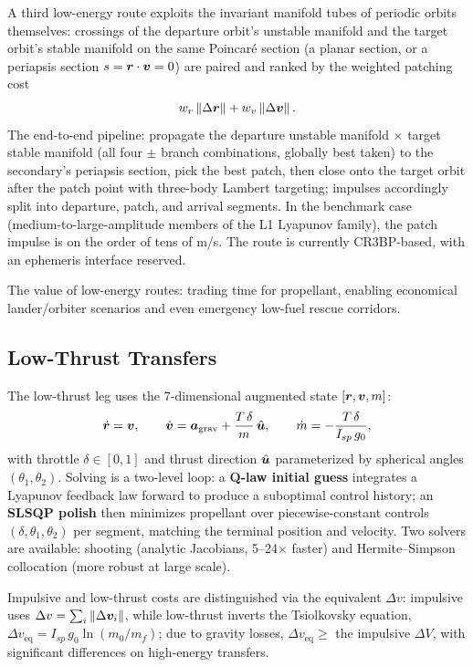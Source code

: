 A third low-energy route exploits the invariant manifold tubes of periodic
orbits themselves: crossings of the departure orbit's unstable manifold and
the target orbit's stable manifold on the same Poincar\'e section (a planar
section, or a periapsis section $s = \bm{r} \cdot \bm{v} = 0$) are paired
and ranked by the weighted patching cost
\begin{equation}
  w_r \left\lVert \Delta \bm{r} \right\rVert + w_v \left\lVert \Delta \bm{v} \right\rVert.
\end{equation}
The end-to-end pipeline: propagate the departure unstable manifold $\times$
target stable manifold (all four $\pm$ branch combinations, globally best
taken) to the secondary's periapsis section, pick the best patch, then close
onto the target orbit after the patch point with three-body Lambert
targeting; impulses accordingly split into departure, patch, and arrival
segments. In the benchmark case (medium-to-large-amplitude members of the L1
Lyapunov family), the patch impulse is on the order of tens of m/s. The route
is currently CR3BP-based, with an ephemeris interface reserved.

The value of low-energy routes: trading time for propellant, enabling
economical lander/orbiter scenarios and even emergency low-fuel rescue
corridors.

\subsection{Low-Thrust Transfers}

The low-thrust leg uses the 7-dimensional augmented state
$[\bm{r}, \bm{v}, m]$:
\begin{equation}
  \dot{\bm{r}} = \bm{v}, \qquad
  \dot{\bm{v}} = \bm{a}_{\mathrm{grav}} + \frac{T\,\delta}{m}\,\hat{\bm{u}}, \qquad
  \dot m = -\frac{T\,\delta}{I_{sp}\, g_0},
\end{equation}
with throttle $\delta \in [0,1]$ and thrust direction $\hat{\bm{u}}$
parameterized by spherical angles $(\theta_1, \theta_2)$. Solving is a
two-level loop: a \textbf{Q-law initial guess} integrates a Lyapunov feedback
law forward to produce a suboptimal control history; an \textbf{SLSQP
polish} then minimizes propellant over piecewise-constant controls
$(\delta, \theta_1, \theta_2)$ per segment, matching the terminal position
and velocity. Two solvers are available: shooting (analytic Jacobians,
5--24$\times$ faster) and Hermite--Simpson collocation (more robust at large
scale).

Impulsive and low-thrust costs are distinguished via the equivalent
$\Delta v$: impulsive uses $\Delta v = \sum_i \left\lVert \Delta \bm{v}_i \right\rVert$, while
low-thrust inverts the Tsiolkovsky equation,
$\Delta v_{\mathrm{eq}} = I_{sp}\, g_0 \ln(m_0/m_f)$; due to gravity losses,
$\Delta v_{\mathrm{eq}} \ge$ the impulsive $\Delta V$, with significant
differences on high-energy transfers.

